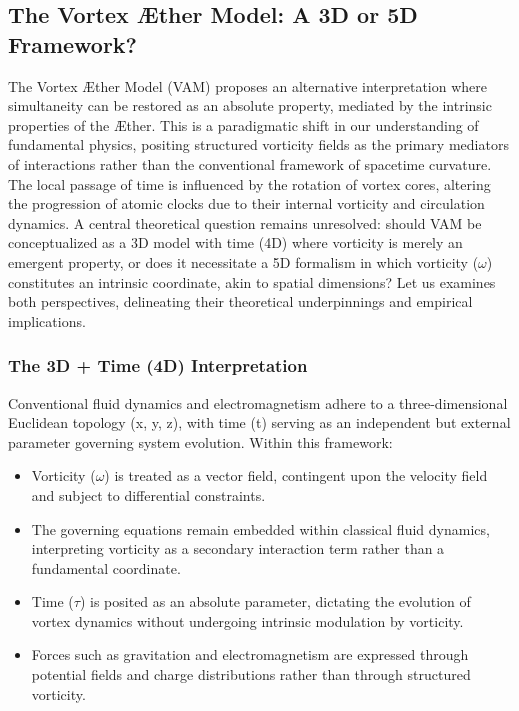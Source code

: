 
\subsection{The Vortex Æther Model: A 3D or 5D Framework?}\label{subsec:the-vortex-ther-model:-a-3d-or-5d-framework?}
The Vortex \AE ther Model (VAM) proposes an alternative interpretation where simultaneity can be restored as an absolute property, mediated by the intrinsic properties of the \AE ther.
This is a paradigmatic shift in our understanding of fundamental physics, positing structured vorticity fields as the primary mediators of interactions rather than the conventional framework of spacetime curvature.
The local passage of time is influenced by the rotation of vortex cores, altering the progression of atomic clocks due to their internal vorticity and circulation dynamics.
A central theoretical question remains unresolved: should VAM be conceptualized as a 3D model with time (4D) where vorticity is merely an emergent property, or does it necessitate a 5D formalism in which vorticity ($\omega$) constitutes an intrinsic coordinate, akin to spatial dimensions?
Let us examines both perspectives, delineating their theoretical underpinnings and empirical implications.

\subsubsection*{The 3D + Time (4D) Interpretation}
Conventional fluid dynamics and electromagnetism adhere to a three-dimensional Euclidean topology (x, y, z), with time (t) serving as an independent but external parameter governing system evolution.
Within this framework:

\begin{itemize}
    \item Vorticity ($\omega$) is treated as a vector field, contingent upon the velocity field and subject to differential constraints.
    \item The governing equations remain embedded within classical fluid dynamics, interpreting vorticity as a secondary interaction term rather than a fundamental coordinate.
    \item Time ($\tau$) is posited as an absolute parameter, dictating the evolution of vortex dynamics without undergoing intrinsic modulation by vorticity.
    \item Forces such as gravitation and electromagnetism are expressed through potential fields and charge distributions rather than through structured vorticity.
\end{itemize}

